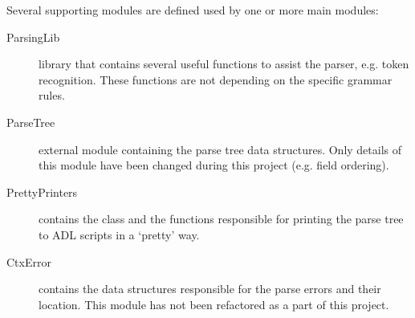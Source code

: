   \noindent
  Several supporting modules are defined used by one or more main modules:
  \begin{description}
    \item[ParsingLib] library that contains several useful functions to assist the parser, e.g. token recognition.
      These functions are not depending on the specific grammar rules.
      
    \item[ParseTree] external module containing the parse tree data structures.
      Only details of this module have been changed during this project (e.g. field ordering).
    
    \item[PrettyPrinters] contains the  class and the functions responsible for printing the parse tree to ADL scripts in a `pretty' way.
    
    \item[CtxError] contains the data structures responsible for the parse errors and their location.
      This module has not been refactored as a part of this project.
    
  \end{description}
